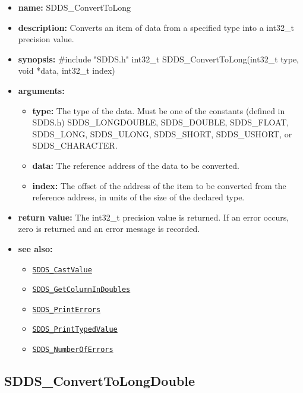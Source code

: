 \documentclass[11pt]{article}
\newcommand{\progref}[1]{\hyperref[SDDS_#1]{\tt SDDS\_#1}}
\begin{document}
\begin{itemize}
\item {\bf name:}\newline
SDDS\_ConvertToLong
\item {\bf description:}\newline
Converts an item of data from a specified type into a int32\_t precision value.
\item {\bf synopsis:} \#include "SDDS.h"\newline
int32\_t SDDS\_ConvertToLong(int32\_t type, void *data, int32\_t index)
\item {\bf arguments:}
\begin{itemize}
\item {\bf type:} The type of the data. Must be one of the constants (defined in SDDS.h) SDDS\_LONGDOUBLE, SDDS\_DOUBLE, SDDS\_FLOAT, SDDS\_LONG, SDDS\_ULONG, SDDS\_SHORT, SDDS\_USHORT, or SDDS\_CHARACTER.
\item {\bf data:} The reference address of the data to be converted.
\item {\bf index:} The offset of the address of the item to be converted from the reference address, in units of the size of the declared type.
\end{itemize}
\item {\bf return value:}\newline
The int32\_t precision value is returned. If an error occurs, zero is returned and an error message is recorded.
\item {\bf see also:}
\begin{itemize}
\item \progref{CastValue}
\item \progref{GetColumnInDoubles}
\item \progref{PrintErrors}
\item \progref{PrintTypedValue}
\item \progref{NumberOfErrors}
\end{itemize}
\end{itemize}

\subsection{SDDS\_ConvertToLongDouble}
\label{SDDS_ConvertToLongDouble}
\end{document}
